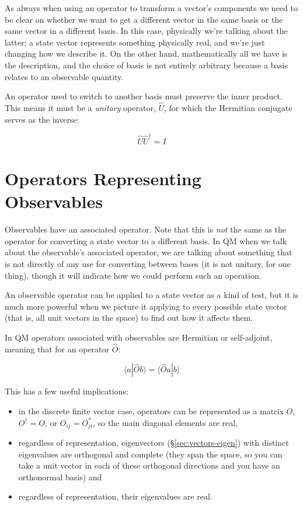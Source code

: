 As always when using an operator to transform a vector's components we need to be clear on whether we want to get a different vector in the same basis or the same vector in a different basis. In this case, physically we're talking about the latter; a state vector represents something physically real, and we're just changing how we describe it. On the other hand, mathematically all we have is the description, and the choice of basis is not entirely arbitrary because a basis relates to an observable quantity.

An operator used to switch to another basis must preserve the inner product. This means it must be a \textit{unitary} operator, $\hat{U}$, for which the Hermitian conjugate serves as the inverse:

$$\hat{U} \hat{U}^\dagger = I$$

\section{Operators Representing Observables} \label{sec:qm-operators1}

Observables have an associated operator. Note that this is \textit{not} the same as the operator for converting a state vector to a different basis. In QM when we talk about the observable's associated operator, we are talking about something that is not directly of any use for converting between bases (it is not unitary, for one thing), though it will indicate how we could perform such an operation.

An observable operator can be applied to a state vector as a kind of test, but it is much more powerful when we picture it applying to every possible state vector (that is, all unit vectors in the space) to find out how it affects them.

In QM operators associated with observables are Hermitian or self-adjoint, meaning that for an operator $\hat{O}$:

$$\langle a|\hat{O} b \rangle = \langle \hat{O} a| b \rangle$$

This has a few useful implications:

\begin{itemize}
  \item in the discrete finite vector case, operators can be represented as a matrix $O$, $O^{\dagger} = O$, or $O_{ij} = O_{ji}^*$, so the main diagonal elements are real,
  \item regardless of representation, eigenvectors (§\ref{sec:vectors-eigen}) with distinct eigenvalues are orthogonal and complete (they span the space, so you can take a unit vector in each of these orthogonal directions and you have an orthonormal basis) and
  \item regardless of representation, their eigenvalues are real.
\end{itemize}

